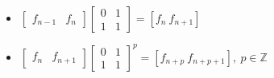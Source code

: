 \begin{itemize}

    \item $\begin{bmatrix} f_{n-1} & f_n \end{bmatrix}
            \begin{bmatrix} 0 & 1 \\ 1 & 1 \end{bmatrix} =
            \left [ f_n\ f_{n+1} \right ]$
    \item $\begin{bmatrix} f_n & f_{n+1} \end{bmatrix}
            {\begin{bmatrix} 0 & 1 \\ 1 & 1 \end{bmatrix}}^p =
            \left [ f_{n+p}\ f_{n+p+1} \right ],
            \ p \in \mathbb{Z}$
\end{itemize}